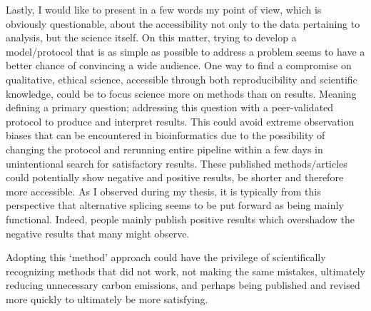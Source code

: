 Lastly, I would like to present in a few words my point of view, which is obviously questionable, about the accessibility not only to the data pertaining to analysis, but the science itself. On this matter, trying to develop a model/protocol that is as simple as possible to address a problem seems to have a better chance of convincing a wide audience. One way to find a compromise on qualitative, ethical science, accessible through both reproducibility and scientific knowledge, could be to focus science more on methods than on results. Meaning defining a primary question; addressing this question with a peer-validated protocol to produce and interpret results. This could avoid extreme observation biases that can be encountered in bioinformatics due to the possibility of changing the protocol and rerunning entire pipeline within a few days in unintentional search for satisfactory results.
These published methods/articles could potentially show negative and positive results, be shorter and therefore more accessible. As I observed during my thesis, it is typically from this perspective that alternative splicing seems to be put forward as being mainly functional. Indeed, people mainly publish positive results which overshadow the negative results that many might observe.

Adopting this `method' approach could have the privilege of scientifically recognizing methods that did not work, not making the same mistakes, ultimately reducing unnecessary carbon emissions, and perhaps being published and revised more quickly to ultimately be more satisfying. 